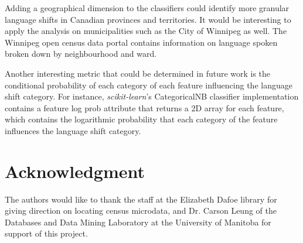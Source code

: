 \documentclass[10pt, conference, compsocconf]{IEEEtran}
\begin{document}
Adding a geographical dimension to the classifiers could identify more granular language shifts in Canadian provinces and territories. It would be interesting to apply the analysis on municipalities such as the City of Winnipeg as well. The Winnipeg open census data portal contains information on language spoken broken down by neighbourhood and ward.

Another interesting metric that could be determined in future work is the conditional probability of each category of each feature influencing the language shift category. For instance, \textit{scikit-learn}'s CategoricalNB classifier implementation contains a feature log prob attribute that returns a 2D array for each feature, which contains the logarithmic probability that each category of the feature influences the language shift category.

\section*{Acknowledgment}


The authors would like to thank the staff at the Elizabeth Dafoe library for giving direction on locating census microdata, and Dr. Carson Leung of the Databases and Data Mining Laboratory at the University of Manitoba for support of this project.





\end{document}
